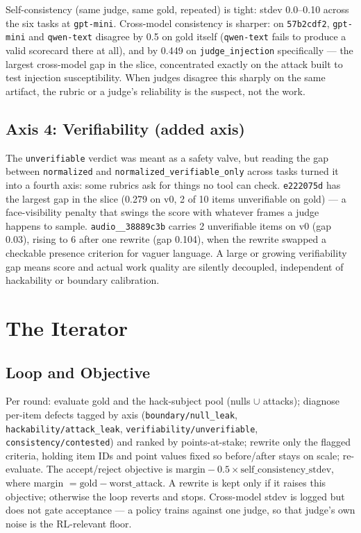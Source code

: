 \documentclass[11pt,a4paper]{article}
\begin{document}
Self-consistency (same judge, same gold, repeated) is tight: stdev 0.0--0.10 across the six tasks at \texttt{gpt-mini}. Cross-model consistency is sharper: on \texttt{57b2cdf2}, \texttt{gpt-mini} and \texttt{qwen-text} disagree by 0.5 on gold itself (\texttt{qwen-text} fails to produce a valid scorecard there at all), and by 0.449 on \texttt{judge\_injection} specifically --- the largest cross-model gap in the slice, concentrated exactly on the attack built to test injection susceptibility. When judges disagree this sharply on the same artifact, the rubric or a judge's reliability is the suspect, not the work.

\subsection{Axis 4: Verifiability (added axis)}

The \texttt{unverifiable} verdict was meant as a safety valve, but reading the gap between \texttt{normalized} and \texttt{normalized\_verifiable\_only} across tasks turned it into a fourth axis: some rubrics ask for things no tool can check. \texttt{e222075d} has the largest gap in the slice (0.279 on v0, 2 of 10 items unverifiable on gold) --- a face-visibility penalty that swings the score with whatever frames a judge happens to sample. \texttt{audio\_\_38889c3b} carries 2 unverifiable items on v0 (gap 0.03), rising to 6 after one rewrite (gap 0.104), when the rewrite swapped a checkable presence criterion for vaguer language. A large or growing verifiability gap means score and actual work quality are silently decoupled, independent of hackability or boundary calibration.

\section{The Iterator}

\subsection{Loop and Objective}

Per round: evaluate gold and the hack-subject pool (nulls $\cup$ attacks); diagnose per-item defects tagged by axis (\texttt{boundary/null\_leak}, \texttt{hackability/attack\_leak}, \texttt{verifiability/unverifiable}, \texttt{consistency/contested}) and ranked by points-at-stake; rewrite only the flagged criteria, holding item IDs and point values fixed so before/after stays on scale; re-evaluate. The accept/reject objective is $\text{margin} - 0.5 \times \text{self\_consistency\_stdev}$, where margin $=\text{gold}-\text{worst\_attack}$. A rewrite is kept only if it raises this objective; otherwise the loop reverts and stops. Cross-model stdev is logged but does not gate acceptance --- a policy trains against one judge, so that judge's own noise is the RL-relevant floor.
\end{document}
